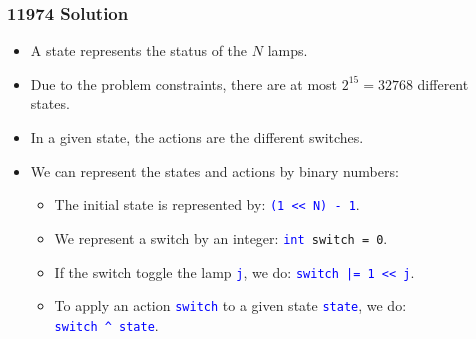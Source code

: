 \documentclass{beamer}
\begin{document}
\begin{frame}%
\frametitle{11974 Solution}

\footnotesize

\begin{itemize}

\item A state represents the status of the $N$ lamps.

\vspace{0.2cm}

\item<2-> Due to the problem constraints, there are at most $2^{15} = 32768$ different states.

\vspace{0.2cm}

\item<3-> In a given state, the actions are the different switches.

\vspace{0.2cm}

\item<4-> We can represent the states and actions by binary numbers:
\begin{itemize}
\footnotesize
\item<4-> The initial state is represented by: \textcolor{blue}{\texttt{(1 << N) - 1}}.
\vspace{0.14cm}
\item<5-> We represent a switch by an integer: \texttt{\textcolor{blue}{int} switch = 0}.
\vspace{0.14cm}
\item<6-> If the switch toggle the lamp \textcolor{blue}{\texttt{j}}, we do: \textcolor{blue}{\texttt{switch |= 1 << j}}.
\vspace{0.14cm}
\item<7-> To apply an action \textcolor{blue}{\texttt{switch}} to a given state
\textcolor{blue}{\texttt{state}}, we do:\\
\vspace{0.12cm}
\hspace{2cm}\textcolor{blue}{\texttt{switch \textasciicircum\ state}}.

\end{itemize}

\end{itemize}

\end{frame}
\end{document}
